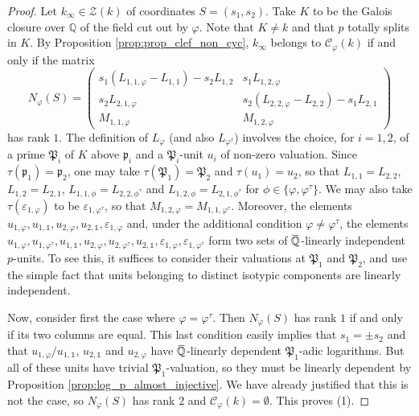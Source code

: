 \documentclass[12pt]{amsart}
\newcommand{\Q}{\mathbb{Q}}
\newcommand\gp{\mathfrak{p}}
\newcommand\gP{\mathfrak{P}}
\newcommand\sC{\mathscr{C}}
\newcommand\sZ{\mathscr{Z}}
\newcommand{\ob}[1]{\mkern 1.5mu\overline{\mkern-1.5mu#1\mkern-1.5mu}\mkern 1.5mu}
\theoremstyle{defstyle}
\theoremstyle{thmstyle}
\begin{document}
	\begin{proof}
		Let $k_\infty\in \sZ(k)$ of coordinates $S=(s_1,s_2)$. Take $K$ to be the Galois closure over $\Q$ of the field cut out by $\varphi$. Note that $K\neq k$ and that $p$ totally splits in $K$. By Proposition \ref{prop:prop_clef_non_cyc}, $k_\infty$ belongs to $\sC_\varphi(k)$ if and only if the matrix
		\[N_\varphi(S)=\begin{pmatrix}
			s_1(L_{1,1,\varphi}-L_{1,1})-s_2 L_{1,2} & s_1L_{1,2,\varphi} \\
			s_2 L_{2,1,\varphi} & s_2(L_{2,2,\varphi}-L_{2,2}) - s_1 L_{2,1} \\
			M_{1,1,\varphi} & M_{1,2,\varphi}
		\end{pmatrix}\]
		has rank $1$. The definition of $L_\varphi$ (and also $L_{\varphi^\tau}$) involves the choice, for $i=1,2$, of a prime $\gP_i$ of $K$ above $\gp_i$ and a $\gP_i$-unit $u_i$ of non-zero valuation. Since $\tau(\gp_1)=\gp_2$, one may take  $\tau(\gP_1)=\gP_2$ and $\tau(u_1)=u_2$, so that $L_{1,1}=L_{2,2}$, $L_{1,2}=L_{2,1}$, $L_{1,1,\phi}=L_{2,2,\phi^\tau}$ and $L_{1,2,\phi}=L_{2,1,\phi^\tau}$ for $\phi\in\{\varphi,\varphi^\tau\}$. 
		We may also take $\tau(\varepsilon_{1,\varphi})$ to be $\varepsilon_{1,\varphi^\tau}$, so that $M_{1,2,\varphi}= M_{1,1,\varphi^\tau}$. Moreover, the elements $u_{1,\varphi},u_{1,\mathds{1}},u_{2,\varphi},u_{2,\mathds{1}},\varepsilon_{1,\varphi}$ and, under the additional condition $\varphi\neq \varphi^\tau$, the elements $u_{1,\varphi},u_{1,\varphi^\tau},u_{1,\mathds{1}},u_{2,\varphi},u_{2,\varphi^\tau},u_{2,\mathds{1}},\varepsilon_{1,\varphi},\varepsilon_{1,\varphi^\tau}$ form two sets of $\ob{\Q}$-linearly independent $p$-units. To see this, it suffices to consider their valuations at $\gP_1$ and $\gP_2$, and use the simple fact that units belonging to distinct isotypic components are linearly independent.
		
		Now, consider first the case where $\varphi=\varphi^\tau$. Then $N_\varphi(S)$ has rank $1$ if and only if its two columns are equal. This last condition easily implies that $s_1=\pm s_2$ and that $u_{1,\varphi}/u_{1,\mathds{1}}$, $u_{2,\mathds{1}}$ and $u_{2,\varphi}$ have $\ob{\Q}$-linearly dependent $\gP_1$-adic logarithms. But all of these units have trivial $\gP_1$-valuation, so they must be linearly dependent by Proposition \ref{prop:log_p_almost_injective}. We have already justified that this is not the case, so $N_{\varphi}(S)$ has rank $2$ and $\sC_\varphi(k)=\emptyset$. This proves (1).
		

\end{proof}
\end{document}
